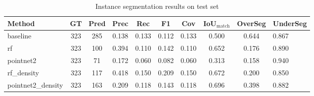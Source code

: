 \begin{table}[htbp]
\centering
\caption{Instance segmentation results on test set}
\begin{tabular}{l c c c c c c c c}
\hline
Method & GT & Pred & Prec & Rec & F1 & Cov & IoU$_{\text{match}}$ & OverSeg & UnderSeg \\
\hline
baseline & 323 & 285 & 0.138 & 0.133 & 0.112 & 0.133 & 0.500 & 0.644 & 0.867 \\
rf & 323 & 100 & 0.394 & 0.110 & 0.142 & 0.110 & 0.652 & 0.176 & 0.890 \\
pointnet2 & 323 & 71 & 0.172 & 0.060 & 0.082 & 0.060 & 0.313 & 0.158 & 0.940 \\
rf_density & 323 & 117 & 0.418 & 0.150 & 0.209 & 0.150 & 0.672 & 0.200 & 0.850 \\
pointnet2_density & 323 & 163 & 0.209 & 0.118 & 0.143 & 0.118 & 0.696 & 0.398 & 0.882 \\
\hline
\end{tabular}
\end{table}
